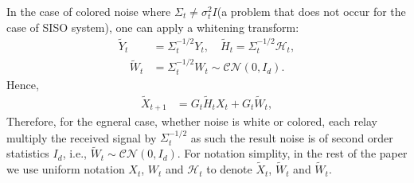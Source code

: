 \documentclass[journal]{IEEEtran}
\begin{document}
In the case of colored noise where $\Sigma_t\neq \sigma_t^2 I$(a problem that does not occur for the case of SISO system), one can apply a whitening transform:
\begin{align}
    \widetilde{Y}_t &= \Sigma_t^{-1/2} Y_t, \quad \widetilde{H}_t=\Sigma_t^{-1/2} \mathcal{H}_t,\\ \quad \widetilde{W}_t&=\Sigma_t^{-1/2} W_t \sim \mathcal{CN}(0,I_d).
    \label{eq:whiten}
\end{align}
Hence, 
\begin{align}
 \widetilde{X}_{t+1} &= G_t \widetilde{H}_t X_t + G_t \widetilde{W}_t,
    \label{eq:af_compact}
\end{align}
Therefore, for the egneral case, whether noise is white or colored, each relay multiply the received signal by $\Sigma_t^{-1/2}$ as such the result noise is of second order statistics $I_d$, i.e.,  $\widetilde{W}_t\sim\mathcal{CN}(0,I_d)$. For notation simplity, in the rest of the paper we use uniform notation $X_{t}$, $W_t$ and $\mathcal{H}_t$ to denote $\widetilde{X}_t$, $\widetilde{W}_t$ and $\widetilde{W}_t$. 


\end{document}

